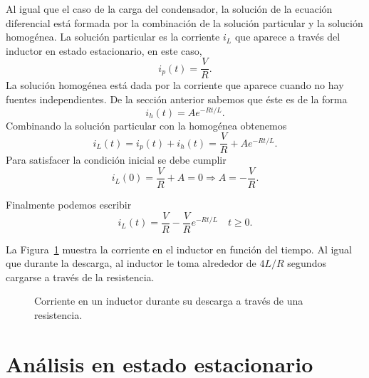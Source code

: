 \documentclass[paper=letter, fontsize=11pt]{scrartcl}
\begin{document}
Al igual que el caso de la carga del condensador, la solución de la ecuación
diferencial está formada por la combinación de la solución particular y la
solución homogénea. La solución particular es la corriente $i_L$ que aparece a
través del inductor en estado estacionario, en este caso,
%
\begin{equation}
  i_p(t) = \frac{V}{R}.
\end{equation}
%
La solución homogénea está dada por la corriente que aparece cuando no hay
fuentes independientes. De la sección anterior sabemos que éste es de la forma
%
\begin{equation}
  i_h(t) = Ae^{-Rt/L}.
\end{equation}
%
Combinando la solución particular con la homogénea obtenemos
%
\begin{equation}
  i_L(t) = i_p(t) + i_h(t) = \frac{V}{R} + A e^{-Rt/L}.
\end{equation}
%
Para satisfacer la condición inicial se debe cumplir
%
\begin{equation}
  i_L(0) = \frac{V}{R} + A = 0 \Rightarrow A = -\frac{V}{R}.
\end{equation}

Finalmente podemos escribir
%
\begin{equation}
  i_L(t) = \frac{V}{R} - \frac{V}{R}e^{-Rt/L} \quad t \geq 0.
\end{equation}

La Figura~\ref{fig:Lcarg} muestra la corriente en el inductor en función del
tiempo. Al igual que durante la descarga, al inductor le toma alrededor de
$4L/R$ segundos cargarse a través de la resistencia.

\begin{figure}[h!]
  \centering
  \caption{Corriente en un inductor durante su descarga a través de una
    resistencia. }
\label{fig:Lcarg}
\end{figure}

\section{Análisis en estado estacionario}
\end{document}
